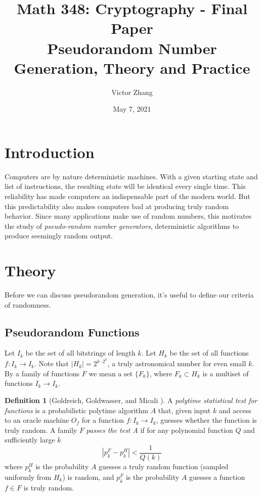 \documentclass[titlepage]{article}
\title{%
  Math 348: Cryptography - Final Paper \\
  \large Pseudorandom Number Generation, Theory and Practice
}
\author{Victor Zhang}
\date{May 7, 2021}
\theoremstyle{definition}
\newtheorem{definition}{Definition}[section]
\begin{document}
\maketitle

\section{Introduction}
Computers are by nature deterministic machines. With a given starting state and list of instructions, the resulting state will be identical every single time. This reliability has made computers an indispensable part of the modern world. But this predictability also makes computers bad at producing truly random behavior. Since many applications make use of random numbers, this motivates the study of \textit{pseudo-random number generators}, deterministic algorithms to produce seemingly random output.

\section{Theory}
Before we can discuss pseudorandom generation, it's useful to define our criteria of randomness.
\subsection{Pseudorandom Functions}
Let $I_k$ be the set of all bitstrings of length $k$. Let $H_k$ be the set of all functions $f: I_k \to I_k$. Note that $|H_k| = 2^{k \cdot 2^k}$, a truly astronomical number for even small $k$. By a family of functions $F$ we mean a set $\{F_k\}$, where $F_k \subset H_k$ is a multiset of functions $I_k \to I_k$.

\begin{definition}[Goldreich, Goldwasser, and Micali \cite{GGS}]
A \textit{polytime statistical test for functions} is a probabilistic polytime algorithm $A$ that, given input $k$ and access to an oracle machine $O_f$ for a function $f: I_k \to I_k$, guesses whether the function is truly random. A family $F$ \textit{passes the test A} if for any polynomial function $Q$ and sufficiently large $k$
$$|p_k^F - p_k^H| < \frac{1}{Q(k)}$$
where $p_k^H$ is the probability $A$ guesses a truly random function (sampled uniformly from $H_k$) is random, and $p_k^F$ is the probability $A$ guesses a function $f \in F$ is truly random.
\end{definition}
\end{document}
